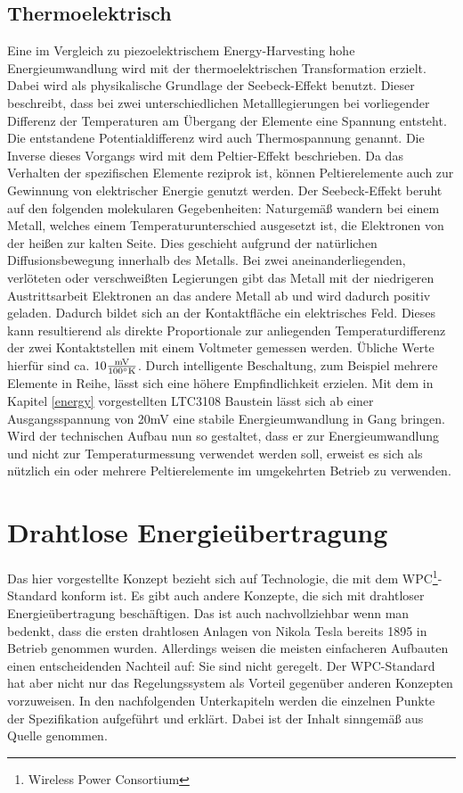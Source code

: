 \documentclass[12pt]{scrreprt} %
\begin{document}
\subsection{Thermoelektrisch}
Eine im Vergleich zu piezoelektrischem Energy-Harvesting hohe Energieumwandlung wird mit der thermoelektrischen Transformation erzielt. Dabei wird als physikalische Grundlage der Seebeck-Effekt benutzt. Dieser beschreibt, dass bei zwei unterschiedlichen Metalllegierungen bei vorliegender Differenz der Temperaturen am Übergang der Elemente eine Spannung entsteht. Die entstandene Potentialdifferenz wird auch Thermospannung \citep[vgl. S.158]{Schruefer2012} genannt. Die Inverse dieses Vorgangs wird mit dem Peltier-Effekt beschrieben. Da das Verhalten der spezifischen Elemente reziprok ist, können Peltierelemente auch zur Gewinnung von elektrischer Energie genutzt werden. \newline
Der Seebeck-Effekt beruht auf den folgenden molekularen Gegebenheiten: Naturgemäß wandern bei einem Metall, welches einem Temperaturunterschied ausgesetzt ist, die Elektronen von der heißen zur kalten Seite. Dies geschieht aufgrund der natürlichen Diffusionsbewegung innerhalb des Metalls. Bei zwei aneinanderliegenden, verlöteten oder verschweißten Legierungen gibt das Metall mit der niedrigeren Austrittsarbeit Elektronen an das andere Metall ab und wird dadurch positiv geladen. Dadurch bildet sich an der Kontaktfläche ein elektrisches Feld. Dieses kann resultierend als direkte Proportionale zur anliegenden Temperaturdifferenz der zwei Kontaktstellen mit einem Voltmeter gemessen werden. Übliche Werte hierfür sind ca. $10  \frac{\textrm{mV}}{100 \degree \textrm{K}}$. Durch intelligente Beschaltung, zum Beispiel mehrere Elemente in Reihe, lässt sich eine höhere Empfindlichkeit erzielen. Mit dem in Kapitel \vref{energy} vorgestellten LTC3108 Baustein lässt sich ab einer Ausgangsspannung von 20mV eine stabile Energieumwandlung in Gang bringen. \newline \newline
Wird der technischen Aufbau nun so gestaltet, dass er zur Energieumwandlung und nicht zur Temperaturmessung verwendet werden soll, erweist es sich als nützlich ein oder mehrere Peltierelemente im umgekehrten Betrieb zu verwenden. \citep[vgl. S.30]{Dembowski2011}
\section{Drahtlose Energieübertragung}
Das hier vorgestellte Konzept bezieht sich auf Technologie, die mit dem WPC\footnote{Wireless Power Consortium}-Standard konform ist. Es gibt auch andere Konzepte, die sich mit drahtloser Energieübertragung beschäftigen. Das ist auch nachvollziehbar wenn man bedenkt, dass die ersten drahtlosen Anlagen von Nikola Tesla bereits 1895 in Betrieb genommen wurden\citep{TESLA}. Allerdings weisen die meisten einfacheren Aufbauten einen entscheidenden Nachteil auf: Sie sind nicht geregelt. Der WPC-Standard hat aber nicht nur das Regelungssystem als Vorteil gegenüber anderen Konzepten vorzuweisen. In den nachfolgenden Unterkapiteln werden die einzelnen Punkte der Spezifikation aufgeführt und erklärt. Dabei ist der Inhalt sinngemäß aus Quelle \citep{WPC} genommen.
\end{document}
